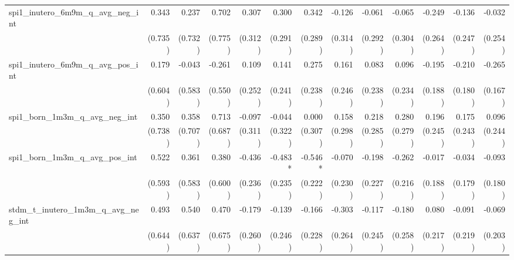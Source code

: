 \begin{tabular}{lrrrrrrrrrrrr}
spi1\_inutero\_6m9m\_q\_avg\_neg\_int       &        0.343 &        0.237 &        0.702 &        0.307 &        0.300 &        0.342 &       -0.126 &       -0.061 &       -0.065 &       -0.249 &       -0.136 &       -0.032 \\ 
                                            &      (0.735) &      (0.732) &      (0.775) &      (0.312) &      (0.291) &      (0.289) &      (0.314) &      (0.292) &      (0.304) &      (0.264) &      (0.247) &      (0.254) \\ 
spi1\_inutero\_6m9m\_q\_avg\_pos\_int       &        0.179 &       -0.043 &       -0.261 &        0.109 &        0.141 &        0.275 &        0.161 &        0.083 &        0.096 &       -0.195 &       -0.210 &       -0.265 \\ 
                                            &      (0.604) &      (0.583) &      (0.550) &      (0.252) &      (0.241) &      (0.238) &      (0.246) &      (0.238) &      (0.234) &      (0.188) &      (0.180) &      (0.167) \\ 
spi1\_born\_1m3m\_q\_avg\_neg\_int          &        0.350 &        0.358 &        0.713 &       -0.097 &       -0.044 &        0.000 &        0.158 &        0.218 &        0.280 &        0.196 &        0.175 &        0.096 \\ 
                                            &      (0.738) &      (0.707) &      (0.687) &      (0.311) &      (0.322) &      (0.307) &      (0.298) &      (0.285) &      (0.279) &      (0.245) &      (0.243) &      (0.244) \\ 
spi1\_born\_1m3m\_q\_avg\_pos\_int          &        0.522 &        0.361 &        0.380 &       -0.436 &      -0.483* &      -0.546* &       -0.070 &       -0.198 &       -0.262 &       -0.017 &       -0.034 &       -0.093 \\ 
                                            &      (0.593) &      (0.583) &      (0.600) &      (0.236) &      (0.235) &      (0.222) &      (0.230) &      (0.227) &      (0.216) &      (0.188) &      (0.179) &      (0.180) \\ 
stdm\_t\_inutero\_1m3m\_q\_avg\_neg\_int    &        0.493 &        0.540 &        0.470 &       -0.179 &       -0.139 &       -0.166 &       -0.303 &       -0.117 &       -0.180 &        0.080 &       -0.091 &       -0.069 \\ 
                                            &      (0.644) &      (0.637) &      (0.675) &      (0.260) &      (0.246) &      (0.228) &      (0.264) &      (0.245) &      (0.258) &      (0.217) &      (0.219) &      (0.203) \\ 

\end{tabular}
